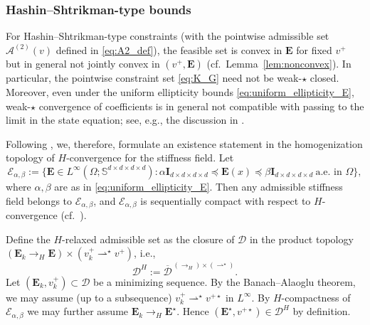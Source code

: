 \documentclass[preprint,3p]{elsarticle}
\newcommand{\tens}[1]{\bm{\mathit{#1}}}             %
\newcommand{\tensf}[1]{\bm{\mathbf{#1}}}            %
\begin{document}
\subsubsection{Hashin--Shtrikman-type bounds}
For Hashin--Shtrikman-type constraints (with the pointwise admissible set $\mathcal A^{(2)}(v)$ defined in \eqref{eq:A2_def}), the feasible set is convex in $\tensf E$ for fixed $v^+$ but in general not jointly convex in $(v^+,\tensf E)$ (cf.\ Lemma~\ref{lem:nonconvex}). In particular, the pointwise constraint set \eqref{eq:K_G} need not be weak-$\star$ closed. Moreover, even under the uniform ellipticity bounds \eqref{eq:uniform_ellipticity_E}, weak-$\star$ convergence of coefficients is in general not compatible with passing to the limit in the state equation; see, e.g., the discussion in \citep[Sections~2.2--2.3]{Haslinger2010}.

Following \citep{Haslinger2010}, we, therefore, formulate an existence statement in the homogenization topology of $H$-convergence for the stiffness field. Let
%
\begin{equation}
\mathcal E_{\alpha,\beta}
:=\{\tensf E\in L^\infty(\Omega;\mathbb{S}^{d\times d\times d\times d}) : 
\alpha \tensf{I}_{d\times d\times d\times d} \preceq \tensf{E}(\tens x)\preceq \beta \tensf{I}_{d\times d\times d\times d}\ \text{a.e. in }\Omega\},
\end{equation}
%
where $\alpha,\beta$ are as in \eqref{eq:uniform_ellipticity_E}. Then any admissible stiffness field belongs to $\mathcal E_{\alpha,\beta}$, and $\mathcal E_{\alpha,\beta}$ is sequentially compact with respect to $H$-convergence (cf.\ \citep[Theorem~2.2]{Haslinger2010}).

Define the $H$-relaxed admissible set as the closure of $\mathcal D$ in the product topology $(\tensf E_k \to_H \tensf E)\times(v_k^+\rightharpoonup^\star v^+)$, i.e.,
%
\begin{equation}
\mathcal D^{H}:=\overline{\mathcal D}^{\,(\to_H)\times(\rightharpoonup^\star)}.
\end{equation}
%
Let $(\tensf E_k,v_k^+)\subset\mathcal D$ be a minimizing sequence. By the Banach--Alaoglu theorem, we may assume (up to a subsequence) $v_k^+\rightharpoonup^\star v^{+\star}$ in $L^\infty$. By $H$-compactness of $\mathcal E_{\alpha,\beta}$ we may further assume $\tensf E_k\to_H \tensf E^\star$. Hence $(\tensf E^\star,v^{+\star})\in\mathcal D^{H}$ by definition.
\end{document}
